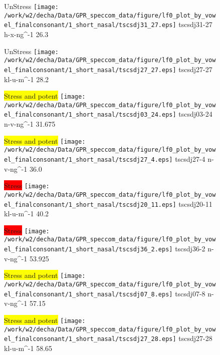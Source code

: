 \documentclass{article}
\begin{document}
\begin{figure}[t]
\begin{minipage}[b]{.24\textwidth}
UnStress
\centering
\texttt{[image: /work/w2/decha/Data/GPR\_speccom\_data/figure/lf0\_plot\_by\_vowel\_finalconsonant/1\_short\_nasal/tscsdj31\_27.eps]}
tscsdj31-27 h-x-ng\textasciicircum-1 26.3
\end{minipage}
\begin{minipage}[b]{.24\textwidth}
UnStress
\centering
\texttt{[image: /work/w2/decha/Data/GPR\_speccom\_data/figure/lf0\_plot\_by\_vowel\_finalconsonant/1\_short\_nasal/tscsdj27\_27.eps]}
tscsdj27-27 kl-u-m\textasciicircum-1 28.2
\end{minipage}
\begin{minipage}[b]{.24\textwidth}
\colorbox{yellow}{Stress and potent}
\centering
\texttt{[image: /work/w2/decha/Data/GPR\_speccom\_data/figure/lf0\_plot\_by\_vowel\_finalconsonant/1\_short\_nasal/tscsdj03\_24.eps]}
tscsdj03-24 n-v-ng\textasciicircum-1 31.675
\end{minipage}
\begin{minipage}[b]{.24\textwidth}
\colorbox{yellow}{Stress and potent}
\centering
\texttt{[image: /work/w2/decha/Data/GPR\_speccom\_data/figure/lf0\_plot\_by\_vowel\_finalconsonant/1\_short\_nasal/tscsdj27\_4.eps]}
tscsdj27-4 n-v-ng\textasciicircum-1 36.0
\end{minipage}
\end{figure}

\begin{figure}[t]
\begin{minipage}[b]{.24\textwidth}
\colorbox{red}{Stress}
\centering
\texttt{[image: /work/w2/decha/Data/GPR\_speccom\_data/figure/lf0\_plot\_by\_vowel\_finalconsonant/1\_short\_nasal/tscsdj20\_11.eps]}
tscsdj20-11 kl-u-m\textasciicircum-1 40.2
\end{minipage}
\begin{minipage}[b]{.24\textwidth}
\colorbox{red}{Stress}
\centering
\texttt{[image: /work/w2/decha/Data/GPR\_speccom\_data/figure/lf0\_plot\_by\_vowel\_finalconsonant/1\_short\_nasal/tscsdj36\_2.eps]}
tscsdj36-2 n-v-ng\textasciicircum-1 53.925
\end{minipage}
\begin{minipage}[b]{.24\textwidth}
\colorbox{yellow}{Stress and potent}
\centering
\texttt{[image: /work/w2/decha/Data/GPR\_speccom\_data/figure/lf0\_plot\_by\_vowel\_finalconsonant/1\_short\_nasal/tscsdj07\_8.eps]}
tscsdj07-8 n-v-ng\textasciicircum-1 57.15
\end{minipage}
\begin{minipage}[b]{.24\textwidth}
\colorbox{yellow}{Stress and potent}
\centering
\texttt{[image: /work/w2/decha/Data/GPR\_speccom\_data/figure/lf0\_plot\_by\_vowel\_finalconsonant/1\_short\_nasal/tscsdj27\_28.eps]}
tscsdj27-28 kl-u-m\textasciicircum-1 58.65
\end{minipage}
\end{figure}

\begin{figure}[t]
\end{figure}
\end{document}
